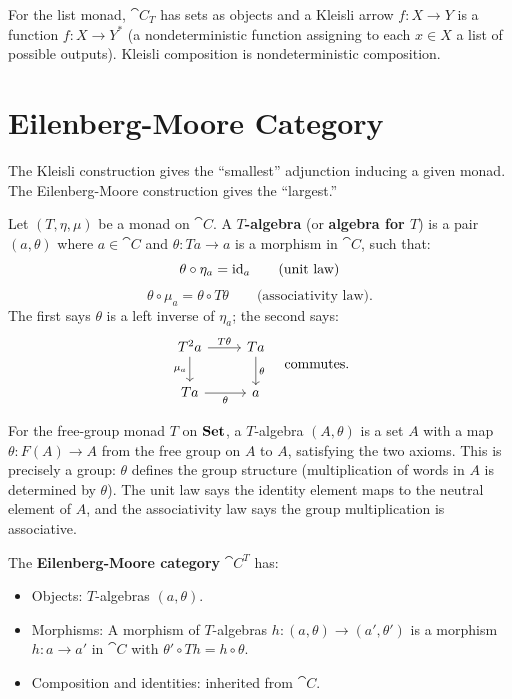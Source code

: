 \begin{example}
For the list monad, $\cat{C}_T$ has sets as objects and a Kleisli arrow $f: X \to Y$ is a function $f: X \to Y^*$ (a nondeterministic function assigning to each $x \in X$ a list of possible outputs). Kleisli composition is nondeterministic composition.
\end{example}

\section{Eilenberg-Moore Category}

The Kleisli construction gives the ``smallest'' adjunction inducing a given monad. The Eilenberg-Moore construction gives the ``largest.''

\begin{definition}[$T$-algebra]
Let $(T, \eta, \mu)$ be a monad on $\cat{C}$. A \textbf{$T$-algebra} (or \textbf{algebra for $T$}) is a pair $(a, \theta)$ where $a \in \cat{C}$ and $\theta: Ta \to a$ is a morphism in $\cat{C}$, such that:
\[
  \theta \circ \eta_a = \mathrm{id}_a \qquad \text{(unit law)}
\]
\[
  \theta \circ \mu_a = \theta \circ T\theta \qquad \text{(associativity law)}.
\]
The first says $\theta$ is a left inverse of $\eta_a$; the second says:
\[
  \begin{tikzcd}
    T^2 a \arrow[r, "T\theta"] \arrow[d, "\mu_a"'] & Ta \arrow[d, "\theta"] \\
    Ta \arrow[r, "\theta"'] & a
  \end{tikzcd}
  \quad \text{commutes.}
\]
\end{definition}

\begin{example}
For the free-group monad $T$ on $\mathbf{Set}$, a $T$-algebra $(A, \theta)$ is a set $A$ with a map $\theta: F(A) \to A$ from the free group on $A$ to $A$, satisfying the two axioms. This is precisely a group: $\theta$ defines the group structure (multiplication of words in $A$ is determined by $\theta$). The unit law says the identity element maps to the neutral element of $A$, and the associativity law says the group multiplication is associative.
\end{example}

\begin{definition}
The \textbf{Eilenberg-Moore category} $\cat{C}^T$ has:
\begin{itemize}
  \item Objects: $T$-algebras $(a, \theta)$.
  \item Morphisms: A morphism of $T$-algebras $h: (a, \theta) \to (a', \theta')$ is a morphism $h: a \to a'$ in $\cat{C}$ with $\theta' \circ Th = h \circ \theta$.
  \item Composition and identities: inherited from $\cat{C}$.
\end{itemize}
\end{definition}

